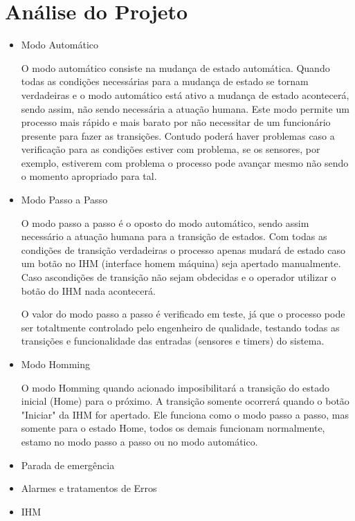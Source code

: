 \documentclass[12pt]{article}
\begin{document}
	\section {Análise do Projeto}
	\begin {itemize}
	\item Modo Automático
	\begin{par}
	
	O modo automático consiste na mudança de estado automática. Quando todas as condições necessárias para a mudança de estado se tornam verdadeiras e o modo automático está ativo a mudança de estado acontecerá, sendo assim, não sendo necessária a atuação humana. Este modo permite um processo mais rápido e mais barato por não necessitar de um funcionário presente para fazer as transições. Contudo poderá haver problemas caso a verificação para as condições estiver com problema, se os sensores, por exemplo, estiverem com problema o processo pode avançar mesmo não sendo o momento apropriado para tal.
	\end{par}
	
	\item Modo Passo a Passo
	
	O modo passo a passo é o oposto do modo automático, sendo assim necessário a atuação humana para a transição de estados. Com todas as condições de transição verdadeiras o processo apenas mudará de estado caso um botão no IHM (interface homem máquina) seja apertado manualmente. Caso ascondições de transição não sejam obdecidas e o operador utilizar o botão do IHM nada acontecerá.
	
	O valor do modo passo a passo é verificado em teste, já que o processo pode ser totaltmente controlado pelo engenheiro de qualidade, testando todas as transições e funcionalidade das entradas (sensores e timers) do sistema.
	
	\item Modo Homming
	
	O modo Homming quando acionado imposibilitará a transição do estado inicial (Home) para o próximo. A transição somente ocorrerá quando o botão "Iniciar" da IHM for apertado. Ele funciona como o modo passo a passo, mas somente para o estado Home, todos os demais funcionam normalmente, estamo no modo passo a passo ou no modo automático.
	
	\item Parada de emergência
	
	
	\item Alarmes e tratamentos de Erros
	
	
	\item IHM
	
	
\end{itemize}
\end{document}
